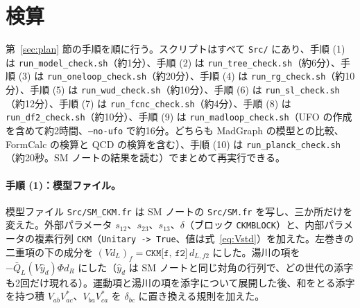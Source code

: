 \documentclass[a4paper,10pt]{ltjsarticle}
\begin{document}
\section{検算}\label{sec:checks}

第~\ref{sec:plan} 節の手順を順に行う。スクリプトはすべて \texttt{Src/} にあり、手順 (1) は \texttt{run\_model\_check.sh}（約1分）、手順 (2) は \texttt{run\_tree\_check.sh}（約6分）、手順 (3) は \texttt{run\_oneloop\_check.sh}（約20分）、手順 (4) は \texttt{run\_rg\_check.sh}（約10分）、手順 (5) は \texttt{run\_wud\_check.sh}（約10分）、手順 (6) は \texttt{run\_sl\_check.sh}（約12分）、手順 (7) は \texttt{run\_fcnc\_check.sh}（約4分）、手順 (8) は \texttt{run\_df2\_check.sh}（約10分）、手順 (9) は \texttt{run\_madloop\_check.sh}（UFO の作成を含めて約2時間、\texttt{--no-ufo} で約16分。どちらも MadGraph の模型との比較、FormCalc の検算と QCD の検算を含む）、手順 (10) は \texttt{run\_planck\_check.sh}（約20秒。SM ノートの結果を読む）でまとめて再実行できる。

\paragraph{手順 (1)：模型ファイル。}模型ファイル \texttt{Src/SM\_CKM.fr} は SM ノートの \texttt{Src/SM.fr} を写し、三か所だけを変えた。外部パラメータ $s_{12}$、$s_{23}$、$s_{13}$、$\delta$（ブロック \texttt{CKMBLOCK}）と、内部パラメータの複素行列 \texttt{CKM}（\texttt{Unitary -> True}、値は式~\eqref{eq:Vstd}）を加えた。左巻きの二重項の下の成分を $(Vd_L)_f=\texttt{CKM[f, f2]}\,d_{L,f2}$ にした。湯川の項を $-\bar Q_L(V\hat y_d)\Phi d_R$ にした（$\hat y_d$ は SM ノートと同じ対角の行列で、どの世代の添字も2回だけ現れる）。運動項と湯川の項を添字について展開した後、和をとる添字を持つ積 $V_{ab}V_{ac}^*$、$V_{ba}V_{ca}^*$ を $\delta_{bc}$ に置き換える規則を加えた。
\end{document}
